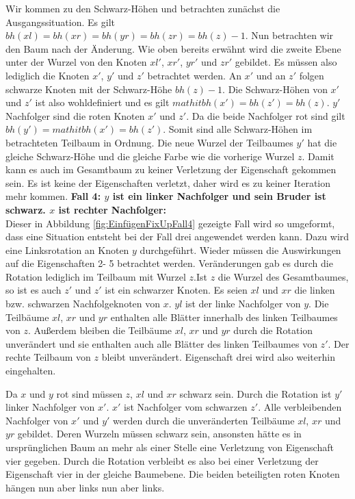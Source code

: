 \documentclass[a4paper,12pt]{article}
\begin{document}
Wir kommen zu den Schwarz-Höhen und betrachten zunächst die Ausgangssituation. Es gilt  $\mathit{bh(xl)} = \mathit{bh(xr)} = \mathit{bh(yr)} =  \mathit{bh(zr)} = \mathit{bh(z)} - 1$. Nun betrachten wir den Baum nach der Änderung. Wie oben bereits erwähnt wird die zweite Ebene unter der Wurzel von den Knoten $\mathit{xl'}$, $\mathit{xr'}$, $\mathit{yr'}$ und $\mathit{zr'}$ gebildet. Es müssen also lediglich die Knoten $x'$, $y'$ und $z'$ betrachtet werden. An $x'$ und an $z'$ folgen schwarze Knoten mit der Schwarz-Höhe $\mathit{bh(z)} - 1$. Die Schwarz-Höhen von $x'$ und $z'$ ist also wohldefiniert und es gilt $mathit{bh(x')} = \mathit{bh(z')} = \mathit{bh(z)}$. $y'$ Nachfolger sind die roten Knoten $x'$ und $z'$. Da die beide Nachfolger rot sind gilt $\mathit{bh(y')} = mathit{bh(x')} = \mathit{bh(z')}$. Somit sind alle Schwarz-Höhen im betrachteten Teilbaum in Ordnung. Die neue Wurzel der Teilbaumes $y'$ hat die gleiche Schwarz-Höhe und die gleiche Farbe wie die vorherige Wurzel $z$. Damit kann es auch im Gesamtbaum zu keiner Verletzung der Eigenschaft gekommen sein.
Es ist keine der Eigenschaften verletzt, daher wird es zu keiner Iteration mehr kommen.
\noindent\textbf{Fall 4: $y$ ist ein linker Nachfolger und sein Bruder ist schwarz. $x$ ist rechter Nachfolger: }\\      
Dieser in Abbildung \ref{fig:EinfügenFixUpFall4} gezeigte Fall wird so umgeformt, dass eine Situation entsteht bei der Fall drei angewendet werden kann. Dazu wird eine Linksrotation an Knoten $y$ durchgeführt. Wieder müssen die Auswirkungen auf die Eigenschaften 2- 5 betrachtet werden. Veränderungen gab es durch die Rotation lediglich im Teilbaum mit Wurzel $z$.Ist $z$ die Wurzel des Gesamtbaumes, so ist es auch $z'$ und $z'$ ist ein schwarzer Knoten. Es seien $\mathit{xl}$ und $\mathit{xr}$ die linken bzw. schwarzen Nachfolgeknoten von $x$. $\mathit{yl}$ ist der linke Nachfolger von $y$. Die Teilbäume  $\mathit{xl}$, $\mathit{xr}$ und $\mathit{yr}$ enthalten alle Blätter innerhalb des linken Teilbaumes von $z$. Außerdem bleiben die Teilbäume  $\mathit{xl}$, $\mathit{xr}$ und $\mathit{yr}$ durch die Rotation unverändert und sie enthalten auch alle Blätter des linken Teilbaumes von $z'$.
Der rechte Teilbaum von $z$ bleibt unverändert. Eigenschaft drei wird also weiterhin eingehalten. 


Da $x$ und $y$ rot sind müssen $z$, $\mathit{xl}$ und $\mathit{xr}$ schwarz sein. Durch die Rotation ist $y'$ linker Nachfolger von $x'$. $x'$ ist Nachfolger vom schwarzen $z'$. Alle verbleibenden Nachfolger von $x'$ und $y'$ werden durch die unveränderten Teilbäume $\mathit{xl}$, $\mathit{xr}$ und $\mathit{yr}$ gebildet. Deren Wurzeln müssen schwarz sein, ansonsten hätte es in ursprünglichen Baum an mehr als einer Stelle eine Verletzung von Eigenschaft vier gegeben. Durch die Rotation verbleibt es also bei einer Verletzung der Eigenschaft vier in der gleiche Baumebene. Die beiden beteiligten roten Knoten hängen nun aber links nun aber links.  
\end{document}
